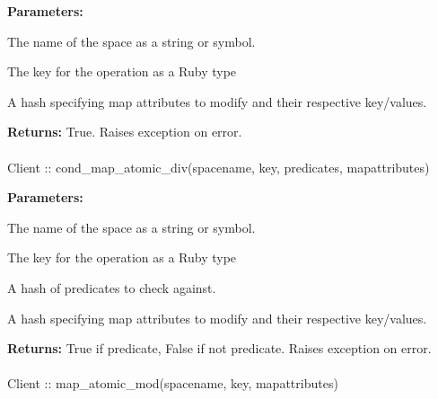 \noindent\textbf{Parameters:}
\begin{description}[labelindent=\widthof{{\code{mapattributes}}},leftmargin=*,noitemsep,nolistsep,align=right]
\item[\code{spacename}] The name of the space as a string or symbol.
\item[\code{key}] The key for the operation as a Ruby type
\item[\code{mapattributes}] A hash specifying map attributes to modify and their respective key/values.
\end{description}

\noindent\textbf{Returns:}
True.  Raises exception on error.

\paragraph{}
\label{api:ruby:cond_map_atomic_div}
\begin{ccode}
Client :: cond_map_atomic_div(spacename, key, predicates, mapattributes)
\end{ccode}
\funcdesc 

\noindent\textbf{Parameters:}
\begin{description}[labelindent=\widthof{{\code{mapattributes}}},leftmargin=*,noitemsep,nolistsep,align=right]
\item[\code{spacename}] The name of the space as a string or symbol.
\item[\code{key}] The key for the operation as a Ruby type
\item[\code{predicates}] A hash of predicates to check against.
\item[\code{mapattributes}] A hash specifying map attributes to modify and their respective key/values.
\end{description}

\noindent\textbf{Returns:}
True if predicate, False if not predicate.  Raises exception on error.

\paragraph{}
\label{api:ruby:map_atomic_mod}
\begin{ccode}
Client :: map_atomic_mod(spacename, key, mapattributes)
\end{ccode}
\funcdesc 

